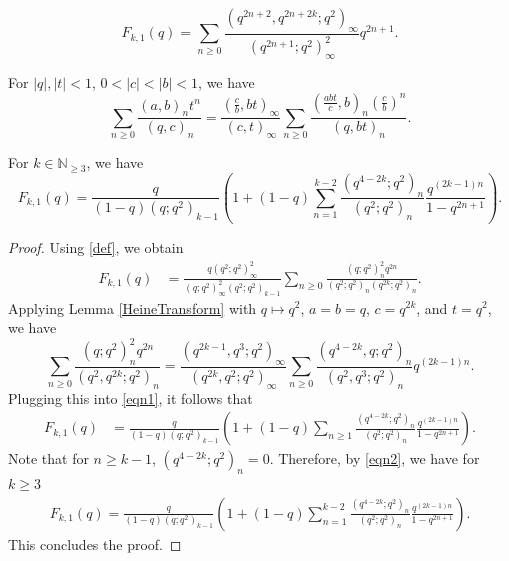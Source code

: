 \documentclass[10pt,a4paper]{amsart}
\newcommand{\pa}[2]{\left(\frac{#1}{#2}\right)}
\begin{document}
\begin{equation}\label{def}
F_{k,1}(q)=\sum_{n\ge 0}\frac{\left(q^{2n+2},q^{2n+2k};q^2\right)_\infty}{\left(q^{2n+1};q^2\right)^2_\infty} q^{2n+1}.
\end{equation}

\begin{lemma}\label{HeineTransform}
	For $|q|, |t|<1$, $0<|c|<|b|<1$, we have
	\[
	\sum_{n\ge 0}\frac{(a,b)_nt^n}{(q,c)_n}=\frac{\left(\frac cb,bt\right)_{\infty}}{(c,t)_{\infty}}\sum_{n\ge 0}\frac{\left(\frac{abt}{c},b\right)_n\pa{c}{b}^n}{(q,bt)_n}.
	\]
\end{lemma}

\begin{lemma}\label{newlem1}
	For $k\in \mathbb{N}_{\ge 3}$, we have
	\[
	F_{k,1}(q)=\frac{q}{\left(1-q\right)\left(q;q^2\right)_{k-1}}\left(1+\left(1-q\right)\sum_{n=1 }^{k-2}\frac{\left(q^{4-2k};q^2\right)_n}{\left(q^2;q^2\right)_n}\frac{q^{(2k-1)n}}{1-q^{2n+1}}\right).
	\]	
\end{lemma}

\begin{proof}
	Using \eqref{def}, we obtain 
	\begin{align}\label{eqn1}
	F_{k,1}(q)
	&=\frac{q\left(q^2;q^2\right)^2_{\infty}}{\left(q;q^2\right)^2_{\infty}\left(q^2;q^2\right)_{k-1}}\sum_{n\ge 0}\frac{\left(q;q^2\right)^2_nq^{2n}}{\left(q^2;q^2\right)_n\left(q^{2k};q^2\right)_{n}}.
	\end{align}
	Applying Lemma \ref{HeineTransform} with $q\mapsto q^2$, $a=b=q$, $c=q^{2k}$, and $t=q^2$, we have
	\begin{equation*}
	\sum_{n\ge 0}\frac{\left(q;q^2\right)^2_nq^{2n}}{\left(q^2,q^{2k};q^2\right)_{n}}=\frac{\left(q^{2k-1},q^3;q^2\right)_{\infty}}{\left(q^{2k},q^2;q^2\right)_{\infty}}\sum_{n\ge 0}\frac{\left(q^{4-2k},q;q^2\right)_n}{\left(q^2,q^3;q^2\right)_n}q^{(2k-1)n}.
	\end{equation*}
	Plugging this into \eqref{eqn1}, it follows that 
	\begin{align}\label{eqn2}
	F_{k,1}(q)
	&\!=\frac{q}{\left(1-q\right)\left(q;q^2\right)_{k-1}}\left(1+\left(1-q\right)\sum_{n\ge 1}\frac{\left(q^{4-2k};q^2\right)_n}{\left(q^2;q^2\right)_n}\frac{q^{(2k-1)n}}{1-q^{2n+1}}\right).
	\end{align}
	Note that for $n\ge k-1$, $(q^{4-2k};q^2)_n=
	0$. Therefore, by \eqref{eqn2}, we have for $k\ge 3$
	\begin{align*}%
	F_{k,1}(q)=\frac{q}{\left(1-q\right)\left(q;q^2\right)_{k-1}}\left(1+\left(1-q\right)\sum_{n=1 }^{k-2}\frac{\left(q^{4-2k};q^2\right)_n}{\left(q^2;q^2\right)_n}\frac{q^{(2k-1)n}}{1-q^{2n+1}}\right).
	\end{align*}
	This concludes the proof.
\end{proof}
\end{document}
